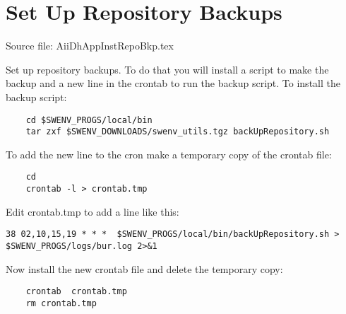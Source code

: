 
\section{Set Up Repository Backups}

Source file: AiiDhAppInstRepoBkp.tex

Set up repository  backups.  To do that you will install a script
to make the backup and a new line in the crontab to run the
backup script.  To install the backup script:
\begin{verbatim}
    cd $SWENV_PROGS/local/bin
    tar zxf $SWENV_DOWNLOADS/swenv_utils.tgz backUpRepository.sh
\end{verbatim}

To add the new line to the cron make a temporary copy of the
crontab file:
\begin{verbatim}
    cd
    crontab -l > crontab.tmp
\end{verbatim}

Edit crontab.tmp to add a line like this:
\begin{verbatim}
38 02,10,15,19 * * *  $SWENV_PROGS/local/bin/backUpRepository.sh > $SWENV_PROGS/logs/bur.log 2>&1
\end{verbatim}


Now install the new crontab file and delete the temporary copy:
\begin{verbatim}
    crontab  crontab.tmp
    rm crontab.tmp
\end{verbatim}


